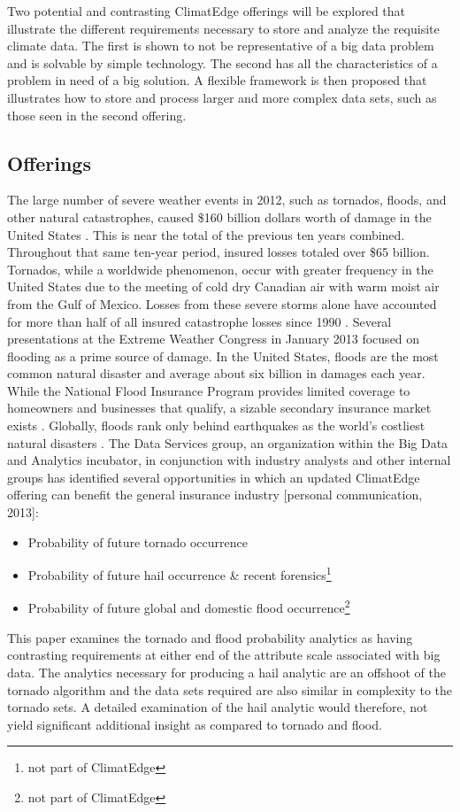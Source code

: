 Two potential and contrasting ClimatEdge offerings will be explored that illustrate the different requirements necessary to store and analyze the requisite climate data. The first is shown to not be representative of a big data problem and is solvable by simple technology. The second has all the characteristics of a problem in need of a big solution. A flexible framework is then proposed that illustrates how to store and process larger and more complex data sets, such as those seen in the second offering.
\subsection{Offerings}
The large number of severe weather events in 2012, such as tornados, floods, and other natural catastrophes, caused \$160 billion dollars worth of damage in the United States \cite{stalder}. This is near the total of the previous ten years combined. Throughout that same ten-year period, insured losses totaled over \$65 billion. Tornados, while a worldwide phenomenon, occur with greater frequency in the United States due to the meeting of cold dry Canadian air with warm moist air from the Gulf of Mexico. Losses from these severe storms alone have accounted for more than half of all insured catastrophe losses since 1990 \cite{lloyds}. Several presentations at the Extreme Weather Congress in January 2013 focused on flooding as a prime source of damage. In the United States, floods are the most common natural disaster and average about six billion in damages each year. While the National Flood Insurance Program provides limited coverage to homeowners and businesses that qualify, a sizable secondary insurance market exists \cite{hope}. Globally, floods rank only behind earthquakes as the world's costliest natural disasters \cite{li}. The Data Services group, an organization within the Big Data and Analytics incubator, in conjunction with industry analysts and other internal groups has identified several opportunities in which an updated ClimatEdge offering can benefit the general insurance industry [personal communication, 2013]:
\begin{itemize}
    \item Probability of future tornado occurrence
    \item Probability of future hail occurrence \& recent forensics\footnote{not part of ClimatEdge}
    \item Probability of future global and domestic flood occurrence\footnote{not part of ClimatEdge}
\end{itemize}
This paper examines the tornado and flood probability analytics as having contrasting requirements at either end of the attribute scale associated with big data. The analytics necessary for producing a hail analytic are an offshoot of the tornado algorithm and the data sets required are also similar in complexity to the tornado sets. A detailed examination of the hail analytic would therefore, not yield significant additional insight as compared to tornado and flood.